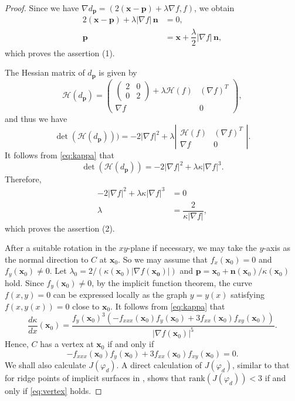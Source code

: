 \documentclass[10pt,a4paper]{amsart}
\newcommand{\n}{\mathbf{n}}
\newcommand{\x}{\mathbf{x}}
\newcommand{\p}{\mathbf{p}}
\renewcommand{\phi}{\varphi}
\newcommand{\rank}{\mathrm{rank}}
\begin{document}
\begin{proof}
Since we have $\nabla d_\p=(2(\x-\p)+\lambda \nabla f,f)$, we obtain 
\begin{align*}
2(\x-\p)+\lambda |\nabla f|\,\n& =0, \\
\p&=\x+\dfrac{\lambda}2|\nabla f|\,\n,
\end{align*} 
which proves the assertion (1). 

The Hessian matrix of $d_\p$ is given by
$$
\mathcal{H}(d_\p) = 
\begin{pmatrix}
\begin{pmatrix}2&0\\0&2\end{pmatrix}+\lambda \mathcal{H}(f) & (\nabla f)^T\\
\nabla f & 0
\end{pmatrix},
$$
and thus we have
$$
\det(\mathcal{H}(d_\p))) = -2|\nabla f|^2+\lambda\left|\begin{matrix}\mathcal{H}(f)&(\nabla f)^T\\\nabla f&0\end{matrix}\right|.
$$
It follows from \eqref{eq:kappa} that 
$$
\det(\mathcal{H}(d_\p))=-2|\nabla f|^2+\lambda \kappa |\nabla f|^3.
$$
Therefore, 
\begin{align*}
-2|\nabla f|^2+\lambda \kappa |\nabla f|^3 & = 0 \\
\lambda & = \dfrac2{\kappa |\nabla f|},
\end{align*}
which proves the assertion (2). 

After a suitable rotation in the $xy$-plane if necessary, we may take
the $y$-axis as the normal direction to $C$ at $\x_0$. 
So we may assume that $f_x(\x_0)=0$ and $f_y(\x_0)\ne0$.  
Let $\lambda_0=2/(\kappa(\x_0)|\nabla f(\bm{x_0})|)$ and $\p=\x_0+\n(\x_0)/\kappa(\x_0)$ hold. 
Since $f_y(\x_0)\ne0$, by the implicit function theorem, the curve $f(x,y)=0$ can be expressed locally as the graph $y=y(x)$ satisfying $f(x,y(x))=0$ close to $\x_0$. 
It follows from \eqref{eq:kappa} that 
\begin{equation*}
\dfrac{d\kappa}{dx}(\x_0)=\dfrac{f_y(\x_0)^3(-f_{xxx}(\x_0)f_y(\x_0)+3f_{xx}(\x_0)f_{xy}(\x_0))}{|\nabla f(\x_0)|^5}.
\end{equation*}
Hence, $C$ has a vertex at $\x_0$ if and only if 
\begin{equation}
\label{eq:vertex}
-f_{xxx}(\x_0)f_y(\x_0)+3f_{xx}(\x_0)f_{xy}(\x_0)=0.
\end{equation}
We shall also calculate $J(\phi_d)$. 
A direct calculation of $J(\phi_d)$, similar to that for ridge points
of implicit surfaces in \cite{Hasegawa2017}, shows that $\rank(J(\phi_d))<3$ if and only if \eqref{eq:vertex} holds. 
\end{proof}
\end{document}
